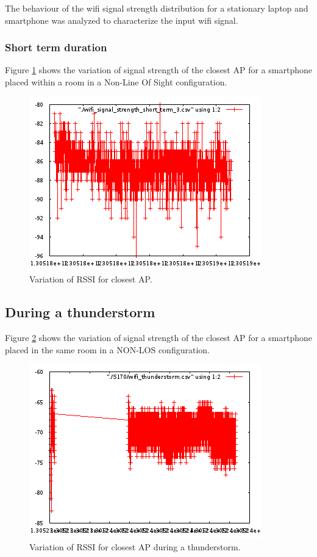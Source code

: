 The behaviour of the wifi signal strength distribution for a stationary laptop 
and smartphone was analyzed to characterize the input wifi signal.

\subsubsection{Short term duration}

Figure \ref{fig:closestAPshortterm} shows the variation of signal strength of 
the closest AP for a smartphone placed within a room in a 
Non-Line Of Sight configuration.

\begin{figure}\centering
    \includegraphics{figures/short_term_wifi.png}
    \caption{Variation of RSSI for closest AP. \label{fig:closestAPshortterm}}
\end{figure}



\subsection{During a thunderstorm}

Figure \ref{fig:closestAPthunderstorm} shows the variation of signal strength of
the closest AP for a smartphone placed in the same room in a 
NON-LOS configuration.

\begin{figure}\centering
    \includegraphics{figures/wifi_thunderstorm.png}
    \caption{Variation of RSSI for closest AP during a thunderstorm. \label{fig:closestAPthunderstorm}}
\end{figure}

